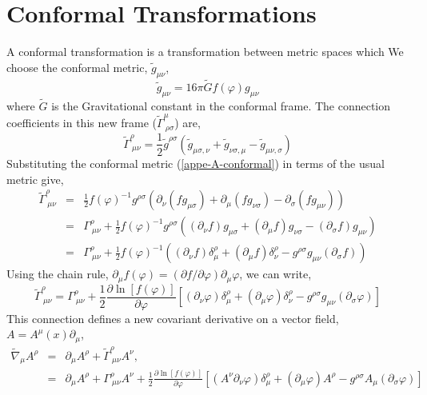 \chapter{Conformal Transformations}\label{appendixConformalTrans}
A conformal transformation is a transformation between metric spaces which We choose the conformal metric, $\tilde{g}_{\mu\nu}$, 
\begin{equation}\label{appe-A-conformal}
    \tilde{g}_{\mu\nu} = 16\pi\tilde{G}f(\varphi)g_{\mu\nu}
\end{equation}
where $\tilde{G}$ is the Gravitational constant in the conformal frame. The connection coefficients in this new frame ($\tilde{\Gamma}^{\mu}_{\ \rho\sigma}$) are, 
\begin{equation}
    \tilde{\Gamma}^{\rho}_{\ \mu\nu} = \frac{1}{2}\tilde{g}^{\rho\sigma}\left(\tilde{g}_{\mu\sigma, \nu} + \tilde{g}_{\nu\sigma, \mu} - \tilde{g}_{\mu\nu, \sigma}  \right)
\end{equation}
Substituting the conformal metric (\ref{appe-A-conformal}) in terms of the usual metric give, 
\begin{eqnarray}
    \tilde{\Gamma}^{\rho}_{\ \mu\nu} &=& \frac{1}{2}f(\varphi)^{-1}g^{\rho\sigma}\left(\partial_{\nu}(fg_{\mu\sigma}) + \partial_{\mu}(fg_{\nu\sigma})- \partial_{\sigma}(fg_{\mu\nu}) \right)\\
    &=& \Gamma^{\rho}_{\ \mu\nu} + \frac{1}{2}f(\varphi)^{-1}g^{\rho\sigma}\left((\partial_{\nu}f)g_{\mu\sigma} + (\partial_{\mu}f)g_{\nu\sigma} -(\partial_{\sigma}f)g_{\mu\nu} \right)\\
    &=& \Gamma^{\rho}_{\ \mu\nu} + \frac{1}{2}f(\varphi)^{-1}\left((\partial_{\nu}f)\delta^{\rho}_{\mu} + (\partial_{\mu}f)\delta^{\rho}_{\nu} -g^{\rho\sigma}g_{\mu\nu}(\partial_{\sigma}f)\right)
\end{eqnarray}
Using the chain rule, $\partial_{\mu}f(\varphi) = (\partial f/\partial \varphi)\partial_{\mu}\varphi$, we can write, 
\begin{equation}
    \tilde{\Gamma}^{\rho}_{\ \mu\nu} = \Gamma^{\rho}_{\ \mu\nu} + \frac{1}{2}\frac{\partial \ln[f(\varphi)]}{\partial \varphi}\left[(\partial_{\nu}\varphi)\delta^{\rho}_{\mu} + (\partial_{\mu}\varphi)\delta^{\rho}_{\nu} -g^{\rho\sigma}g_{\mu\nu}(\partial_{\sigma}\varphi)\right]
\end{equation}
This connection defines a new covariant derivative on a vector field, $A = A^{\mu}(x)\partial_{\mu}$, 
\begin{eqnarray*}
\tilde{\nabla}_{\mu}A^{\rho} &=& \partial_{\mu}A^{\rho} + \tilde{\Gamma}^{\rho}_{\ \mu\nu}A^{\nu},\\
&=& \partial_{\mu}A^{\rho} + \Gamma^{\rho}_{\ \mu\nu}A^{\nu} + \frac{1}{2}\frac{\partial \ln[f(\varphi)]}{\partial \varphi}\left[(A^{\nu}\partial_{\nu}\varphi)\delta^{\rho}_{\mu} + (\partial_{\mu}\varphi)A^{\rho} -g^{\rho\sigma}A_{\mu}(\partial_{\sigma}\varphi)\right]
\end{eqnarray*}

